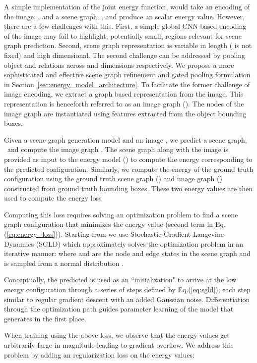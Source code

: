 \documentclass[final]{cvpr}
\newcommand{\imagegraph}{}
\begin{document}
A simple implementation of the joint energy function, would take an encoding of the image, , and a scene graph, , and produce an scalar energy value. However, there are a few challenges with this. First, a simple global CNN-based encoding of the image may fail to highlight, potentially small, regions relevant for scene graph prediction. Second, scene graph representation is variable in length ( is not fixed) and high dimensional. The second challenge can be addressed by pooling object  and relations  across  and  dimensions respectively. We propose a more sophisticated and effective scene graph refinement and gated pooling formulation in  Section~\ref{sec:energy_model_architecture}. 
To facilitate the former challenge of image encoding, we extract a graph based representation from the image.
This representation is henceforth referred to as an image graph (\imagegraph).
The nodes of the image graph are instantiated using features extracted from the object bounding boxes.




Given a scene graph generation model  and an image , we predict a scene graph,  \  and compute the image graph \imagegraph. The scene graph along with the image is provided as input to the energy model () to compute the energy corresponding to the predicted configuration. Similarly, we compute the energy of the ground truth configuration using the ground truth scene graph  () and image graph () constructed from ground truth bounding boxes.  These two energy values are then used to compute the energy loss

Computing this loss requires solving an optimization problem to find a scene graph configuration that minimizes the energy value (second term in Eq.(\ref{eq:energy_loss})). Starting from  we use Stochastic Gradient Langevine Dynamics (SGLD) \cite{welling2011bayesian} which approximately solves the optimization problem in an iterative manner: 
where  and  are the node and edge states in the scene graph and  is sampled from a normal distribution . 

Conceptually, the predicted  is used as an ``initialization" to arrive at the low energy configuration through a series of steps defined by Eq.(\ref{eq:sgld}); each step similar to regular gradient descent with an added Gaussian noise. Differentiation through the optimization path guides parameter learning of the model  that generates  in the first place. 



When training using the above loss, we observe that the energy values get arbitrarily large in magnitude leading to gradient overflow.  We address this problem by adding an  regularization loss on the energy values:
\end{document}
